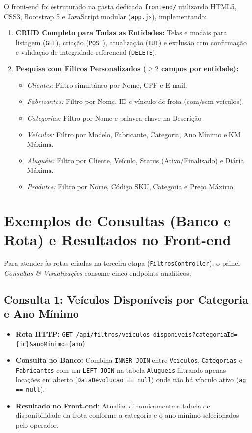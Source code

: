 \documentclass[12pt]{article}
\begin{document}
O front-end foi estruturado na pasta dedicada \texttt{frontend/} utilizando HTML5, CSS3, Bootstrap 5 e JavaScript modular (\texttt{app.js}), implementando:
\begin{enumerate}
  \item \textbf{CRUD Completo para Todas as Entidades:} Telas e modais para listagem (\texttt{GET}), criação (\texttt{POST}), atualização (\texttt{PUT}) e exclusão com confirmação e validação de integridade referencial (\texttt{DELETE}).
  \item \textbf{Pesquisa com Filtros Personalizados ($\ge 2$ campos por entidade):}
  \begin{itemize}
    \item \textit{Clientes:} Filtro simultâneo por Nome, CPF e E-mail.
    \item \textit{Fabricantes:} Filtro por Nome, ID e vínculo de frota (com/sem veículos).
    \item \textit{Categorias:} Filtro por Nome e palavra-chave na Descrição.
    \item \textit{Veículos:} Filtro por Modelo, Fabricante, Categoria, Ano Mínimo e KM Máxima.
    \item \textit{Aluguéis:} Filtro por Cliente, Veículo, Status (Ativo/Finalizado) e Diária Máxima.
    \item \textit{Produtos:} Filtro por Nome, Código SKU, Categoria e Preço Máximo.
  \end{itemize}
\end{enumerate}

\section{Exemplos de Consultas (Banco e Rota) e Resultados no Front-end}

Para atender às rotas criadas na terceira etapa (\texttt{FiltrosController}), o painel \textit{Consultas \& Visualizações} consome cinco endpoints analíticos:

\subsection{Consulta 1: Veículos Disponíveis por Categoria e Ano Mínimo}
\begin{itemize}
  \item \textbf{Rota HTTP:} \texttt{GET /api/filtros/veiculos-disponiveis?categoriaId=\{id\}\&anoMinimo=\{ano\}}
  \item \textbf{Consulta no Banco:} Combina \texttt{INNER JOIN} entre \texttt{Veiculos}, \texttt{Categorias} e \texttt{Fabricantes} com um \texttt{LEFT JOIN} na tabela \texttt{Alugueis} filtrando apenas locações em aberto (\texttt{DataDevolucao == null}) onde não há vínculo ativo (\texttt{ag == null}).
  \item \textbf{Resultado no Front-end:} Atualiza dinamicamente a tabela de disponibilidade da frota conforme a categoria e o ano mínimo selecionados pelo operador.
\end{itemize}
\end{document}

